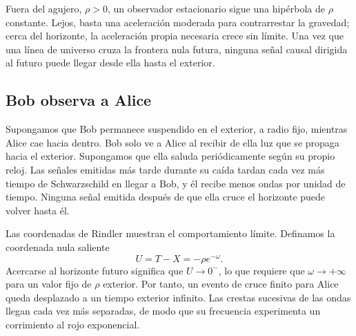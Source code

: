 Fuera del agujero, \(\rho>0\), un observador estacionario sigue una hipérbola de \(\rho\) constante. Lejos, basta una aceleración moderada para contrarrestar la gravedad; cerca del horizonte, la aceleración propia necesaria crece sin límite. Una vez que una línea de universo cruza la frontera nula futura, ninguna señal causal dirigida al futuro puede llegar desde ella hasta el exterior.

\begin{classroomqa}
\end{classroomqa}

\begin{classroomqa}
\end{classroomqa}

\subsection{Bob observa a Alice}

Supongamos que Bob permanece suspendido en el exterior, a radio fijo, mientras Alice cae hacia dentro. Bob solo ve a Alice al recibir de ella luz que se propaga hacia el exterior. Supongamos que ella saluda periódicamente según su propio reloj. Las señales emitidas más tarde durante su caída tardan cada vez más tiempo de Schwarzschild en llegar a Bob, y él recibe menos ondas por unidad de tiempo. Ninguna señal emitida después de que ella cruce el horizonte puede volver hasta él.

Las coordenadas de Rindler muestran el comportamiento límite. Definamos la coordenada nula saliente
\begin{equation}
U=T-X=-\rho e^{-\omega}.
\end{equation}
Acercarse al horizonte futuro significa que \(U\to0^{-}\), lo que requiere que \(\omega\to+\infty\) para un valor fijo de \(\rho\) exterior. Por tanto, un evento de cruce finito para Alice queda desplazado a un tiempo exterior infinito. Las crestas sucesivas de las ondas llegan cada vez más separadas, de modo que su frecuencia experimenta un corrimiento al rojo exponencial.

